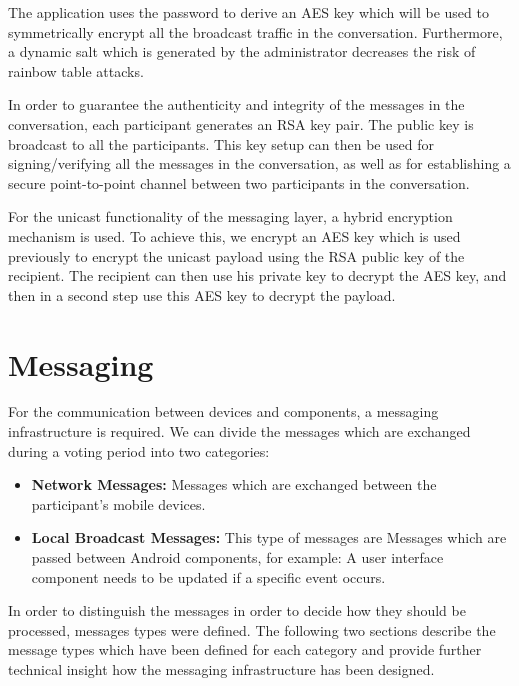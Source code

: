 \documentclass[numbers=noenddot, abstract=on, a4paper, headsepline,
footsepline, oneside, openright, draft=off, listof=leveldown]{scrreprt}
\begin{document}
The application uses the password to derive an AES key which will be used to
symmetrically encrypt all the broadcast traffic in the conversation.
Furthermore, a dynamic salt which is generated by the administrator decreases
the risk of rainbow table attacks.

In order to guarantee the authenticity and integrity of the messages in the
conversation, each participant generates an RSA key pair. The public key is 
broadcast to all the participants. This key setup can then be used for
signing/verifying all the messages in the conversation, as well as for
establishing a secure point-to-point channel between two participants in the
conversation.

For the unicast functionality of the messaging layer, a hybrid encryption
mechanism is used. To achieve this, we encrypt an AES key which is used
previously to encrypt the unicast payload using the RSA public key of the
recipient. The recipient can then use his private key to decrypt the AES key,
and then in a second step use this AES key to decrypt the payload.

\section{Messaging}
\label{sec:messaging}
For the communication between devices and components, a messaging infrastructure
is required. We can divide the messages which are exchanged during a voting
period into two categories:
\begin{itemize}
  \item \textbf{Network Messages:} Messages which are exchanged
  between the participant's mobile devices.
  \item \textbf{Local Broadcast Messages:} This type of messages are Messages
  which are passed between Android components, for example: A user
  interface component needs to be updated if a specific event occurs. 
\end{itemize}
In order to distinguish the messages in order to decide how they should be
processed, messages types were defined. The following two sections describe the
message types which have been defined for each category and provide further
technical insight how the messaging infrastructure has been designed.
\end{document}
